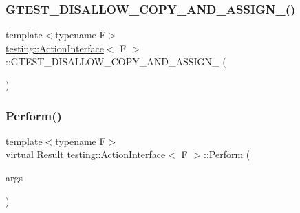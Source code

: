 \subsubsection{\texorpdfstring{GTEST\_DISALLOW\_COPY\_AND\_ASSIGN\_()}{GTEST\_DISALLOW\_COPY\_AND\_ASSIGN\_()}\hspace{0.1cm}{\footnotesize\ttfamily [3/3]}}
{\footnotesize\ttfamily template$<$typename F$>$ \\
\mbox{\hyperlink{classtesting_1_1_action_interface}{testing\+::\+Action\+Interface}}$<$ F $>$\+::G\+T\+E\+S\+T\+\_\+\+D\+I\+S\+A\+L\+L\+O\+W\+\_\+\+C\+O\+P\+Y\+\_\+\+A\+N\+D\+\_\+\+A\+S\+S\+I\+G\+N\+\_\+ (\begin{DoxyParamCaption}\item[{\mbox{\hyperlink{classtesting_1_1_action_interface}{Action\+Interface}}$<$ F $>$}]{ }\end{DoxyParamCaption})\hspace{0.3cm}{\ttfamily [private]}}

\mbox{\label{classtesting_1_1_action_interface_a20f8624fcea1786f2992b358760422a0}} 
\subsubsection{\texorpdfstring{Perform()}{Perform()}\hspace{0.1cm}{\footnotesize\ttfamily [1/3]}}
{\footnotesize\ttfamily template$<$typename F$>$ \\
virtual \mbox{\hyperlink{classtesting_1_1_action_interface_a7477de2fe3e4e01c59db698203acaee7}{Result}} \mbox{\hyperlink{classtesting_1_1_action_interface}{testing\+::\+Action\+Interface}}$<$ F $>$\+::Perform (\begin{DoxyParamCaption}\item[{const \mbox{\hyperlink{classtesting_1_1_action_interface_af72720d864da4d606629e83edc003511}{Argument\+Tuple}} \&}]{args }\end{DoxyParamCaption})\hspace{0.3cm}{\ttfamily [pure virtual]}}




